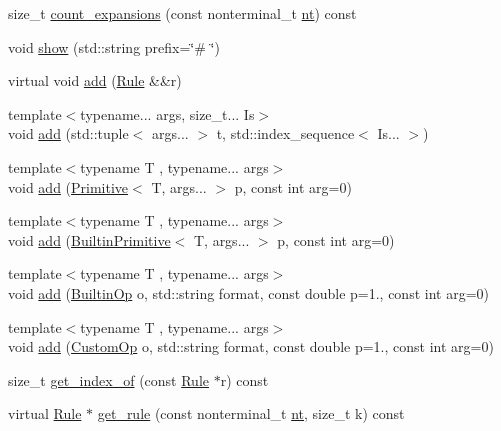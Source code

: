 \begin{DoxyCompactItemize}
size\+\_\+t \hyperlink{class_grammar_a9c015fe6f16191ddb2f21a51f1931a05}{count\+\_\+expansions} (const nonterminal\+\_\+t \hyperlink{class_grammar_aa5c9afa0e7e1aa989b54402b02a677a3}{nt}) const
\item 
void \hyperlink{class_grammar_aa3c730ea64c8ca5d93fecb4275f2e380}{show} (std\+::string prefix=\char`\"{}\# \char`\"{})
\item 
virtual void \hyperlink{class_grammar_af0b97cbaf14fc6be7495c8bb9e888002}{add} (\hyperlink{class_rule}{Rule} \&\&r)
\item 
{\footnotesize template$<$typename... args, size\+\_\+t... Is$>$ }\\void \hyperlink{class_grammar_a37a1dd90b7a315fe97bbdefad7c09df9}{add} (std\+::tuple$<$ args... $>$ t, std\+::index\+\_\+sequence$<$ Is... $>$)
\item 
{\footnotesize template$<$typename T , typename... args$>$ }\\void \hyperlink{class_grammar_a0af8f369b948cde8ee5d403311ec8fa9}{add} (\hyperlink{struct_primitive}{Primitive}$<$ T, args... $>$ p, const int arg=0)
\item 
{\footnotesize template$<$typename T , typename... args$>$ }\\void \hyperlink{class_grammar_af96467de4413d3e5a0d2f291992365d9}{add} (\hyperlink{struct_builtin_primitive}{Builtin\+Primitive}$<$ T, args... $>$ p, const int arg=0)
\item 
{\footnotesize template$<$typename T , typename... args$>$ }\\void \hyperlink{class_grammar_a562f3b4113e3f2764832ac828ffb58fc}{add} (\hyperlink{_instruction_8h_af2fb7c87c5854c5733d7bb0506b06de7}{Builtin\+Op} o, std\+::string format, const double p=1., const int arg=0)
\item 
{\footnotesize template$<$typename T , typename... args$>$ }\\void \hyperlink{class_grammar_aba61b4a7563c249a27ad7b6b808ee575}{add} (\hyperlink{_instruction_8h_a3a20ca4a8f0ab220518b030cc23ffee4}{Custom\+Op} o, std\+::string format, const double p=1., const int arg=0)
\item 
size\+\_\+t \hyperlink{class_grammar_affec19f6e91201c8d29119bf50ffa3e6}{get\+\_\+index\+\_\+of} (const \hyperlink{class_rule}{Rule} $\ast$r) const
\item 
virtual \hyperlink{class_rule}{Rule} $\ast$ \hyperlink{class_grammar_aea24b7ae4a2d61f322504a9f49478bb4}{get\+\_\+rule} (const nonterminal\+\_\+t \hyperlink{class_grammar_aa5c9afa0e7e1aa989b54402b02a677a3}{nt}, size\+\_\+t k) const

\end{DoxyCompactItemize}
